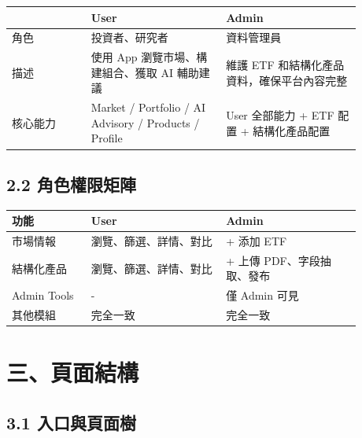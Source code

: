 \begingroup
\small
\begin{longtable}{L{0.20\linewidth}L{0.34\linewidth}L{0.34\linewidth}}
\toprule
 & \textbf{User} & \textbf{Admin} \\
\midrule
角色 & 投資者、研究者 & 資料管理員 \\
描述 & 使用 App 瀏覽市場、構建組合、獲取 AI 輔助建議 & 維護 ETF 和結構化產品資料，確保平台內容完整 \\
核心能力 & Market / Portfolio / AI Advisory / Products / Profile & User 全部能力 + ETF 配置 + 結構化產品配置 \\
\bottomrule
\end{longtable}
\endgroup

\subsection{2.2 角色權限矩陣}

\begingroup
\small
\begin{longtable}{L{0.20\linewidth}L{0.34\linewidth}L{0.34\linewidth}}
\toprule
\textbf{功能} & \textbf{User} & \textbf{Admin} \\
\midrule
市場情報 & 瀏覽、篩選、詳情、對比 & + 添加 ETF \\
結構化產品 & 瀏覽、篩選、詳情、對比 & + 上傳 PDF、字段抽取、發布 \\
Admin Tools & - & 僅 Admin 可見 \\
其他模組 & 完全一致 & 完全一致 \\
\bottomrule
\end{longtable}
\endgroup

\section{三、頁面結構}

\subsection{3.1 入口與頁面樹}







